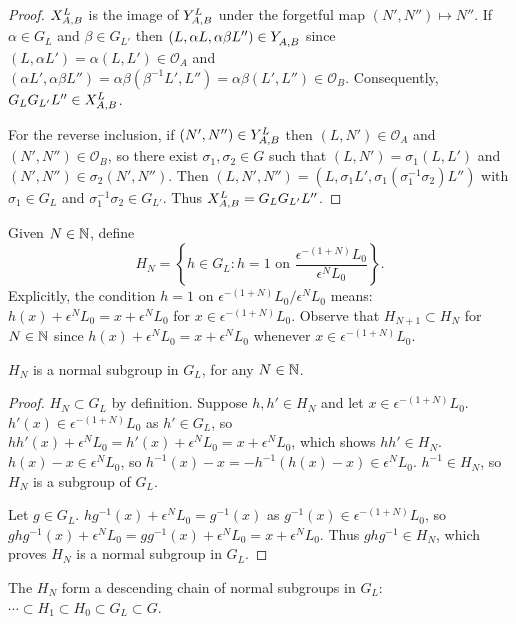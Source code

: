 \documentclass[a4paper, 11pt]{report}
\begin{document}
\begin{proof}
$\xprod[L]{A,B}$ is the image of $\yprod[L]{A,B}$ under the forgetful map $(N',N'')\mapsto N''$. If $\alpha\in G_L$ and $\beta\in G_{L'}$ then $(L,\alpha L,\alpha\beta L'')\in\yprod{A,B}$ since $(L,\alpha L')=\alpha(L,L')\in\mathcal{O}_A$ and $(\alpha L',\alpha\beta L'')=\alpha\beta(\beta^{-1}L',L'')=\alpha\beta(L',L'')\in\mathcal{O}_B$. Consequently, $G_L G_{L'}L''\in\xprod[L]{A,B}$.

For the reverse inclusion, if $(N',N'')\in\yprod[L]{A,B}$ then $(L,N')\in\mathcal{O}_A$ and $(N',N'')\in\mathcal{O}_B$, so there exist $\sigma_1,\sigma_2\in G$ such that $(L,N')=\sigma_1(L,L')$ and $(N',N'')\in\sigma_2(N',N'')$. Then $(L,N',N'') = (L,\sigma_1 L',\sigma_1(\sigma_1^{-1}\sigma_2) L'')$ with $\sigma_1\in G_L$ and $\sigma_1^{-1}\sigma_2\in G_{L'}$. Thus $\xprod[L]{A,B} = G_L G_{L'}L''$.
\end{proof}

Given $N\in\naturals$, define
\begin{equation*}
H_N = \left\{ h\in G_L: h=1 \text{ on } \frac{\epsilon^{-(1+N)}L_0}{\epsilon^N L_0} \right\}.
\end{equation*}
Explicitly, the condition $h=1$ on $\epsilon^{-(1+N)}L_0/{\epsilon^N L_0}$ means: $h(x) + \epsilon^N L_0 = x + \epsilon^N L_0$ for $x\in\epsilon^{-(1+N)}L_0$. Observe that $H_{N+1}\subset H_N$ for $N\in\naturals$ since $h(x) + \epsilon^N L_0 = x + \epsilon^N L_0$ whenever $x\in\epsilon^{-(1+N)}L_0$.

\begin{lemma}
$H_N$ is a normal subgroup in $G_L$, for any $N\in\naturals$.
\end{lemma}

\begin{proof}
$H_N\subset G_L$ by definition. Suppose $h,h'\in H_N$ and let $x\in\epsilon^{-(1+N)}L_0$. $h'(x)\in\epsilon^{-(1+N)}L_0$ as $h'\in G_L$, so $hh'(x) + \epsilon^N L_0 = h'(x) + \epsilon^N L_0 = x + \epsilon^N L_0$, which shows $hh'\in H_N$. $h(x)-x\in\epsilon^N L_0$, so $h^{-1}(x) - x = -h^{-1}(h(x)-x)\in\epsilon^N L_0$. $h^{-1}\in H_N$, so $H_N$ is a subgroup of $G_L$.

Let $g\in G_L$. $hg^{-1}(x) + \epsilon^N L_0 = g^{-1}(x)$ as $g^{-1}(x)\in\epsilon^{-(1+N)}L_0$, so $ghg^{-1}(x) + \epsilon^N L_0 = gg^{-1}(x) + \epsilon^N L_0 = x + \epsilon^N L_0$. Thus $ghg^{-1}\in H_N$, which proves $H_N$ is a normal subgroup in $G_L$.
\end{proof}

The $H_N$ form a descending chain of normal subgroups in $G_L$: $\cdots\subset H_1 \subset H_0 \subset G_L \subset G$.
\end{document}
